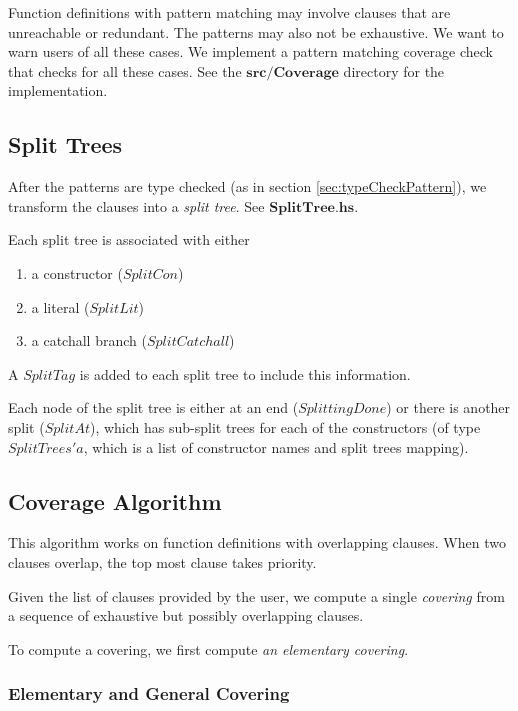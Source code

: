 Function definitions with pattern matching may involve clauses that are unreachable or redundant. The patterns may also not be exhaustive. We want to warn users of all these cases. We implement a pattern matching coverage check that checks for all these cases. See the $\boldsymbol{src/Coverage}$ directory for the implementation.

\subsection{Split Trees}

After the patterns are type checked (as in section \ref{sec:typeCheckPattern}), we transform the clauses into a \textit{split tree}. See $\boldsymbol{SplitTree.hs}$.

Each split tree is associated with either 

\begin{enumerate}
  \item a constructor ($SplitCon$)
  \item a literal ($SplitLit$)
  \item a catchall branch ($SplitCatchall$)
\end{enumerate}

A $SplitTag$ is added to each split tree to include this information. 

Each node of the split tree is either at an end ($SplittingDone$) or there is another split ($SplitAt$), which has sub-split trees for each of the constructors (of type $SplitTrees' a$, which is a list of constructor names and split trees mapping).

\subsection{Coverage Algorithm}

This algorithm works on function definitions with overlapping clauses. When two clauses overlap, the top most clause takes priority.

Given the list of clauses provided by the user, we compute a single \textit{covering} from a sequence of exhaustive but possibly overlapping clauses.

To compute a covering, we first compute \textit{an elementary covering}.

\subsubsection{Elementary and General Covering}

